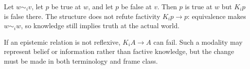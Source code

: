 \begin{example}
Let \(w\sim_i v\), let \(p\) be true at \(w\), and let \(p\) be false at
\(v\).  Then \(p\) is true at \(w\) but \(K_ip\) is false there.  The structure
does not refute factivity \(K_ip\to p\): equivalence makes \(w\sim_i w\), so
knowledge still implies truth at the actual world.
\end{example}

\begin{warning}
If an epistemic relation is not reflexive, \(K_iA\to A\) can fail.  Such a
modality may represent belief or information rather than factive knowledge, but
the change must be made in both terminology and frame class.
\end{warning}

